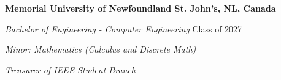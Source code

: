\textbf{Memorial University of Newfoundland \hfill St. John's, NL, Canada} \par
\textit{Bachelor of Engineering - Computer Engineering} \hfill Class of 2027 \par
\textit{Minor: Mathematics (Calculus and Discrete Math)} \par
\textit{Treasurer of IEEE Student Branch}